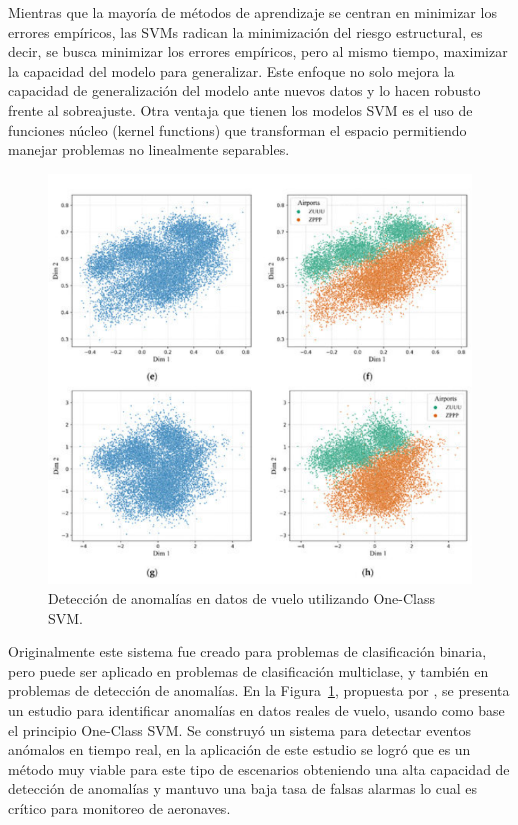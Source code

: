\documentclass[11pt,a4paper,spanish]{book}
\numberwithin{equation}{chapter}
\numberwithin{figure}{chapter}
\begin{document}
Mientras que la mayoría de métodos de aprendizaje se centran en minimizar los errores empíricos, las SVMs radican la minimización del riesgo estructural, es decir, se busca minimizar los errores empíricos, pero al mismo tiempo, maximizar la capacidad del modelo para generalizar. Este enfoque no solo mejora la capacidad de generalización del modelo ante nuevos datos y lo hacen robusto frente al sobreajuste. Otra ventaja que tienen los modelos SVM es el uso de funciones núcleo (kernel functions) que transforman el espacio permitiendo manejar problemas no linealmente separables. 


\begin{figure}[h]
    \centering
    \includegraphics[width=1.0\textwidth]{media/svm-kun.png}
    \caption{Detección de anomalías en datos de vuelo utilizando One-Class SVM.  \protect\cite{qin2022flight} }
    \label{fig:figSVMflight}
\end{figure}


Originalmente este sistema fue creado para problemas de clasificación binaria, pero puede ser aplicado en problemas de clasificación multiclase, y también en problemas de detección de anomalías. En la Figura~\ref{fig:figSVMflight}, propuesta por \cite{qin2022flight}, se presenta un estudio para identificar anomalías en datos reales de vuelo, usando como base el principio One-Class SVM. Se construyó un sistema para detectar eventos anómalos en tiempo real, en la aplicación de este estudio se logró que es un método muy viable para este tipo de escenarios obteniendo una alta capacidad de detección de anomalías y mantuvo una baja tasa de falsas alarmas lo cual es crítico para monitoreo de aeronaves.
\end{document}

